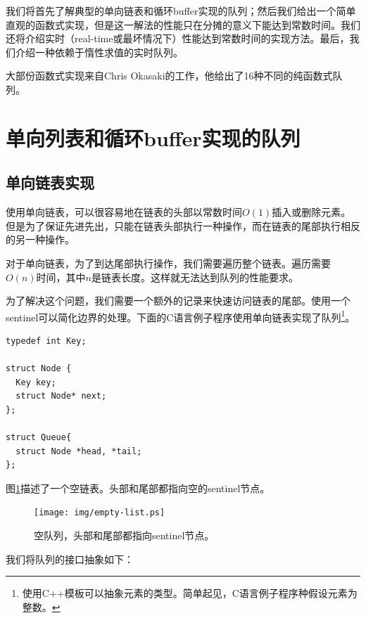 \documentclass[UTF8]{article}
\begin{document}
我们将首先了解典型的单向链表和循环buffer实现的队列；然后我们给出一个简单直观的函数式实现，但是这一解法的性能只在分摊的意义下能达到常数时间。我们还将介绍实时（real-time或最坏情况下）性能达到常数时间的实现方法。最后，我们介绍一种依赖于惰性求值的实时队列。

大部份函数式实现来自Chris Okasaki的工作\cite{okasaki-book}，他给出了16种不同的纯函数式队列。

\section{单向列表和循环buffer实现的队列}

\subsection{单向链表实现}

使用单向链表，可以很容易地在链表的头部以常数时间$O(1)$插入或删除元素。但是为了保证先进先出，只能在链表头部执行一种操作，而在链表的尾部执行相反的另一种操作。

对于单向链表，为了到达尾部执行操作，我们需要遍历整个链表。遍历需要$O(n)$时间，其中$n$是链表长度。这样就无法达到队列的性能要求。

为了解决这个问题，我们需要一个额外的记录来快速访问链表的尾部。使用一个sentinel可以简化边界的处理。下面的C语言例子程序使用单向链表实现了队列\footnote{使用C++模板可以抽象元素的类型。简单起见，C语言例子程序种假设元素为整数。}。

\lstset{language=C}
\begin{lstlisting}
typedef int Key;

struct Node {
  Key key;
  struct Node* next;
};

struct Queue{
  struct Node *head, *tail;
};
\end{lstlisting}

图\ref{fig:empty-list}描述了一个空链表。头部和尾部都指向空的sentinel节点。

\begin{figure}[htbp]
  \centering
  \texttt{[image: img/empty-list.ps]}
  \caption{空队列，头部和尾部都指向sentinel节点。} \label{fig:empty-list}
\end{figure}

我们将队列的接口抽象如下：

\begin{algorithmic}
\EndFunction
{}
\EndFunction
{}
\EndFunction
{}
\EndFunction
{}
\EndFunction
\end{algorithmic}
\end{document}

